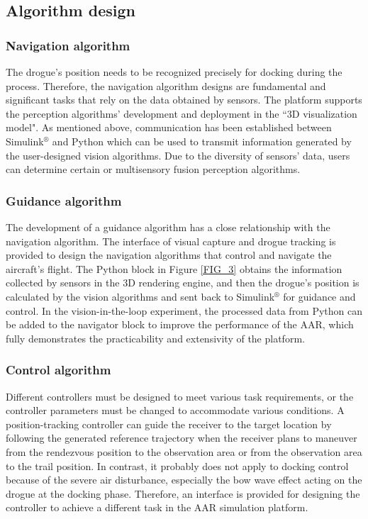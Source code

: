 \subsection{Algorithm design}\label{sec4.3}
\subsubsection{Navigation algorithm}\label{sec4.3.1}
The drogue's position needs to be recognized precisely for docking during the process. Therefore, the navigation algorithm designs are fundamental and significant tasks that rely on the data obtained by sensors. The platform supports the perception algorithms' development and deployment in the ``3D visualization model". As mentioned above, communication has been established between Simulink$^\circledR$ and Python which can be used to transmit information generated by the user-designed vision algorithms. Due to the diversity of sensors' data, users can determine certain or multisensory fusion perception algorithms.
\subsubsection{Guidance algorithm}\label{sec4.3.2}
The development of a guidance algorithm has a close relationship with the navigation algorithm. The interface of visual capture and drogue tracking is provided to design the navigation algorithms that control and navigate the aircraft's flight. The Python block in Figure \ref{FIG_3} obtains the information collected by sensors in the 3D rendering engine, and then the drogue's position is calculated by the vision algorithms and sent back to Simulink$^\circledR$ for guidance and control. In the vision-in-the-loop experiment, the processed data from Python can be added to the navigator block to improve the performance of the AAR, which fully demonstrates the practicability and extensivity of the platform.
\subsubsection{Control algorithm }\label{sec4.3.3}
Different controllers must be designed to meet various task requirements, or the controller parameters must be changed to accommodate various conditions. A position-tracking controller can guide the receiver to the target location by following the generated reference trajectory when the receiver plans to maneuver from the rendezvous position to the observation area or from the observation area to the trail position. In contrast, it probably does not apply to docking control because of the severe air disturbance, especially the bow wave effect acting on the drogue at the docking phase. Therefore, an interface is provided for designing the controller to achieve a different task in the AAR simulation platform. 
